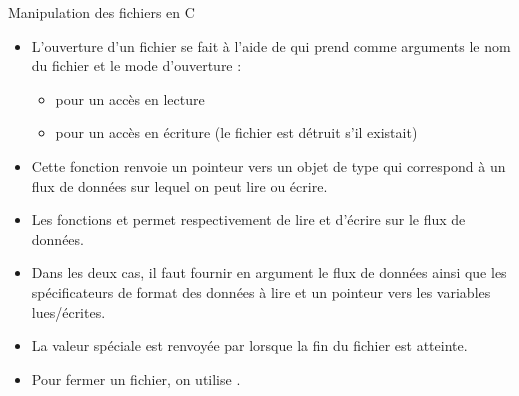 \documentclass[10pt]{beamer}
\begin{document}
\begin{frame}[fragile]{\Ctitle}{\stitle}
	\begin{block}{Manipulation des fichiers en C}
		\begin{itemize}
			\item<1-> L'ouverture d'un fichier se fait à l'aide de  qui prend comme arguments le nom du fichier et le mode d'ouverture :
				\begin{itemize}
					\item<2->  pour un accès en lecture
					\item<3->  pour un accès en écriture (le fichier est détruit s'il existait)
				\end{itemize}
			\item<4-> Cette fonction renvoie un pointeur vers un objet de type  qui correspond à un flux de données sur lequel on peut lire ou écrire.
			\item<5-> Les fonctions   et  permet respectivement de lire et d'écrire sur le flux de données.
			\item<6-> Dans les deux cas, il faut fournir en argument le flux de données ainsi que les spécificateurs de format des données à lire et un pointeur vers les variables lues/écrites.
			\item<7-> La valeur spéciale  est renvoyée par  lorsque la fin du fichier est atteinte.
			\item<8-> Pour fermer un fichier, on utilise .
		\end{itemize}
	\end{block}
\end{frame}
\end{document}
